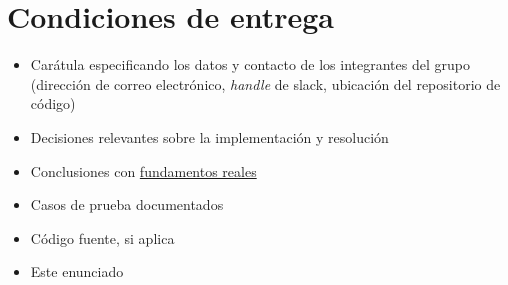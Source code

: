 \documentclass{article}
\begin{document}
\section{Condiciones de entrega}

\begin{itemize}
\item Carátula especificando los datos y contacto de los integrantes del grupo (dirección de correo electrónico, 
\textit{handle} de slack, ubicación del repositorio de código)
\item Decisiones relevantes sobre la implementación y resolución
\item Conclusiones con \underline{fundamentos reales}
\item Casos de prueba documentados
\item Código fuente, si aplica
\item Este enunciado
\end{itemize}
\end{document}
